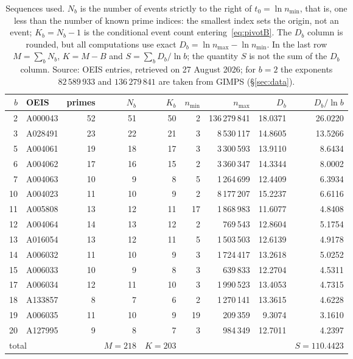 \documentclass[11pt,a4paper]{article}
\theoremstyle{plain}
\theoremstyle{remark}
\begin{document}
\begin{table}[t]
\centering
\caption{Sequences used. $N_b$ is the number of events strictly to the right of
$t_0=\ln n_{\min}$, that is, one less than the number of known prime indices: the
smallest index sets the origin, not an event; $K_b=N_b-1$ is the conditional event
count entering~\eqref{eq:pivotB}. The $D_b$ column is rounded, but all computations
use exact $D_b=\ln n_{\max}-\ln n_{\min}$. In the last row $M=\sum_b N_b$, $K=M-B$
and $S=\sum_b D_b/\ln b$; the quantity $S$ is not the sum of the $D_b$ column.
Source: OEIS entries, retrieved on 27 August 2026; for $b=2$ the exponents
$82\,589\,933$ and $136\,279\,841$ are taken from GIMPS (\S\ref{sec:data}).}
\label{tab:data}
\small
\begin{tabular}{rlrrrrrrr}
\toprule
$b$ & OEIS & primes & $N_b$ & $K_b$ & $n_{\min}$ & $n_{\max}$ & $D_b$ & $D_b/\ln b$\\
\midrule
2 & A000043 & 52 & 51 & 50 & 2 & 136\,279\,841 & 18.0371 & 26.0220\\
3 & A028491 & 23 & 22 & 21 & 3 & 8\,530\,117 & 14.8605 & 13.5266\\
5 & A004061 & 19 & 18 & 17 & 3 & 3\,300\,593 & 13.9110 & 8.6434\\
6 & A004062 & 17 & 16 & 15 & 2 & 3\,360\,347 & 14.3344 & 8.0002\\
7 & A004063 & 10 & 9 & 8 & 5 & 1\,264\,699 & 12.4409 & 6.3934\\
10 & A004023 & 11 & 10 & 9 & 2 & 8\,177\,207 & 15.2237 & 6.6116\\
11 & A005808 & 13 & 12 & 11 & 17 & 1\,868\,983 & 11.6077 & 4.8408\\
12 & A004064 & 14 & 13 & 12 & 2 & 769\,543 & 12.8604 & 5.1754\\
13 & A016054 & 13 & 12 & 11 & 5 & 1\,503\,503 & 12.6139 & 4.9178\\
14 & A006032 & 11 & 10 & 9 & 3 & 1\,724\,417 & 13.2618 & 5.0252\\
15 & A006033 & 10 & 9 & 8 & 3 & 639\,833 & 12.2704 & 4.5311\\
17 & A006034 & 12 & 11 & 10 & 3 & 1\,990\,523 & 13.4053 & 4.7315\\
18 & A133857 & 8 & 7 & 6 & 2 & 1\,270\,141 & 13.3615 & 4.6228\\
19 & A006035 & 11 & 10 & 9 & 19 & 209\,359 & 9.3074 & 3.1610\\
20 & A127995 & 9 & 8 & 7 & 3 & 984\,349 & 12.7011 & 4.2397\\
\midrule
\multicolumn{3}{l}{total} & $M=218$ & $K=203$ & & & & $S=110.4423$\\
\bottomrule
\end{tabular}
\end{table}
\end{document}
